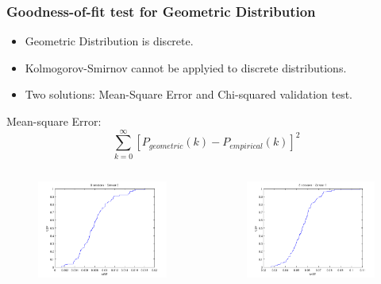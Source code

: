 \documentclass[9pt,handout,serif]{beamer}
\begin{document}
\begin{frame}[c]
	\frametitle{Goodness-of-fit test for Geometric Distribution}
	\begin{itemize}
		\item Geometric Distribution is discrete.
		\item Kolmogorov-Smirnov cannot be applyied to discrete distributions.
		\item Two solutions: Mean-Square Error and Chi-squared validation test.
	\end{itemize}
	Mean-square Error:
	\begin{equation}
		\sum_{k=0}^{\infty}[P_{geometric}(k) - P_{empirical}(k)]^2
	\end{equation}
	
	\begin{columns}
		\begin{figure}
			\centering
			\includegraphics[width=\textwidth]{../images/results/autocorrelation/localview/mse/8sessions_mse_sensor0}
		\end{figure}
		\begin{figure}
			\centering
			\includegraphics[width=1\textwidth]{../images/results/autocorrelation/localview/mse/8sessions_mse_sensor1}

\end{figure}
\end{columns}
\end{frame}
\end{document}
